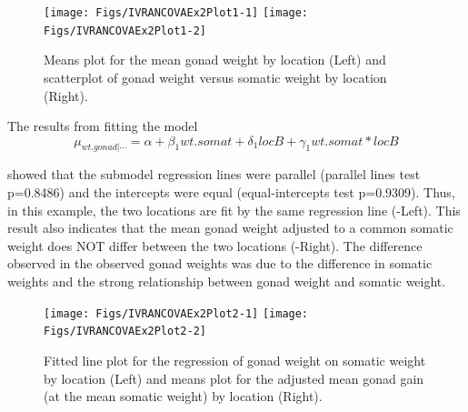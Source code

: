 \documentclass[10pt,openany]{book}\usepackage[]{graphicx}\usepackage[]{color}
\newenvironment{knitrout}{}{} %
\begin{document}
\begin{knitrout}
\color{fgcolor}\begin{figure}[h]

{\centering \texttt{[image: Figs/IVRANCOVAEx2Plot1-1]} 
\texttt{[image: Figs/IVRANCOVAEx2Plot1-2]} 

}

\caption[Means plot for the mean gonad weight by location (Left) and scatterplot of gonad weight versus somatic weight by location (Right)]{Means plot for the mean gonad weight by location (Left) and scatterplot of gonad weight versus somatic weight by location (Right).}\label{fig:IVRANCOVAEx2Plot1}
\end{figure}


\end{knitrout}

The results from fitting the model
\[ \mu_{wt.gonad|\cdots}=\alpha+\beta_{1}wt.somat+\delta_{1}locB+\gamma_{1}wt.somat*locB \]

showed that the submodel regression lines were parallel (parallel lines test p=0.8486) and the intercepts were equal (equal-intercepts test p=0.9309).  Thus, in this example, the two locations are fit by the same regression line (-Left).  This result also indicates that the mean gonad weight adjusted to a common somatic weight does NOT differ between the two locations (-Right).  The difference observed in the observed gonad weights was due to the difference in somatic weights and the strong relationship between gonad weight and somatic weight.

\begin{knitrout}
\color{fgcolor}\begin{figure}[h]

{\centering \texttt{[image: Figs/IVRANCOVAEx2Plot2-1]} 
\texttt{[image: Figs/IVRANCOVAEx2Plot2-2]} 

}

\caption[Fitted line plot for the regression of gonad weight on somatic weight by location (Left) and means plot for the adjusted mean gonad gain (at the mean somatic weight) by location (Right)]{Fitted line plot for the regression of gonad weight on somatic weight by location (Left) and means plot for the adjusted mean gonad gain (at the mean somatic weight) by location (Right).}\label{fig:IVRANCOVAEx2Plot2}
\end{figure}


\end{knitrout}
\end{document}
